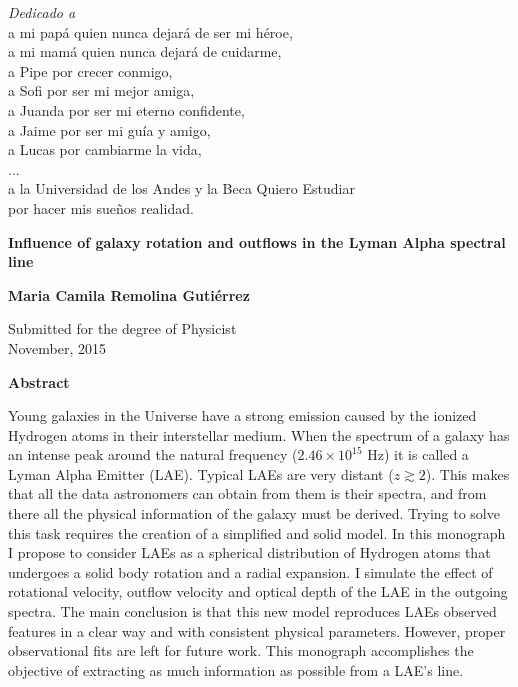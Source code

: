 \newpage
\thispagestyle{empty}
\begin{center}
\vspace*{2cm}
\textit{\LARGE {Dedicado a}}\\ 
a mi pap\'a quien nunca dejar\'a de ser mi h\'eroe, \\ 
a mi mam\'a quien nunca dejar\'a de cuidarme, \\
a Pipe por crecer conmigo, \\
a Sofi por ser mi mejor amiga, \\ 
a Juanda por ser mi eterno confidente, \\ 
a Jaime por ser mi gu\'ia y amigo, \\
a Lucas por cambiarme la vida, \\
...\\
a la Universidad de los Andes y la Beca Quiero Estudiar\\por hacer mis sue\~nos realidad. \\

\end{center}

\newpage
\thispagestyle{empty}
\begin{center}
  \textbf{\Large Influence of galaxy rotation and outflows in the Lyman Alpha spectral line}

  \vspace*{1cm}
  \textbf{\large Maria Camila Remolina Guti\'errez}

  \vspace*{0.5cm}
  {\large Submitted for the degree of Physicist\\ November, 2015}

  \vspace*{1cm}
  \textbf{\large Abstract}
\end{center}
Young galaxies in the Universe have a strong \lya emission caused by the ionized Hydrogen atoms in their interstellar medium. When the spectrum of a galaxy has an intense peak around the \lya natural frequency ($2.46\times 10^{15}$ Hz) it is called a Lyman Alpha Emitter (LAE). Typical LAEs are very distant ($z \gtrsim 2$). This makes that all the data astronomers can obtain from them is their spectra, and from there all the physical information of the galaxy must be derived. Trying to solve this task requires the creation of a simplified and solid model. In this monograph I propose to consider LAEs as a spherical distribution of Hydrogen atoms that undergoes a solid body rotation and a radial expansion. I simulate the effect of rotational velocity, outflow velocity and optical depth of the LAE in the outgoing spectra. The main conclusion is that this new model reproduces LAEs observed features in a clear way and with consistent physical parameters. However, proper observational fits are left for future work. This monograph accomplishes the objective of extracting as much information as possible from a LAE's \lya line.\\ 

